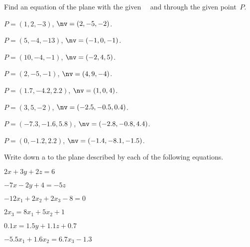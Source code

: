 \begin{exercise} \label{ex:} 
Find an equation of the plane with the given ~\nv\ and through the given point~\(P\).
\begin{parts}
\item \(P=(1,2,-3)\), \(\nv=(2,-5,-2)\).
\item \(P=(5,-4,-13)\), \(\nv=(-1,0,-1)\).
\item \(P=(10,-4,-1)\), \(\nv=(-2,4,5)\).
\item \(P=(2,-5,-1)\), \(\nv=(4,9,-4)\).
\item \(P=(1.7,-4.2,2.2)\), \(\nv=( 1,0,4)\).
\item \(P=(3,5,-2)\), \(\nv=(-2.5,-0.5,0.4)\).
\item \(P=(-7.3,-1.6,5.8)\), \(\nv=(-2.8,-0.8,4.4)\).
\item \(P=(0,-1.2,2.2)\), \(\nv=(-1.4,-8.1,-1.5)\).
\end{parts}
\end{exercise}




\begin{exercise} \label{ex:} 
Write down a  to the plane described by each of the following equations.
\begin{parts}
\item \(2x+3y+2z=6\)
\item \(-7x-2y+4=-5z\)
\item \(-12x_1+2x_2+2x_3-8=0\)
\item \(2x_3=8x_1+5x_2+1\)
\item \(0.1x=1.5y+1.1z+0.7\)
\item \(-5.5x_1+1.6x_2=6.7x_3-1.3\)
\end{parts}
\end{exercise}



